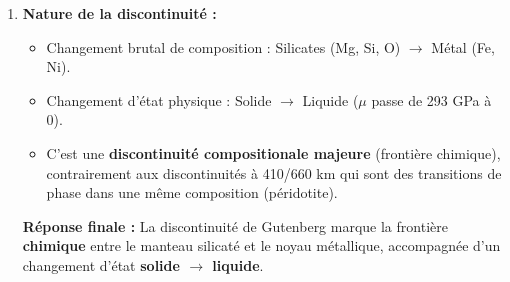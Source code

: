 \documentclass[11pt]{article}
\begin{document}
\begin{exoresolu}
\begin{enumerate}
    \item \textbf{Nature de la discontinuité :}
    \begin{itemize}
        \item Changement brutal de composition : Silicates (Mg, Si, O) $\rightarrow$ Métal (Fe, Ni).
        \item Changement d'état physique : Solide $\rightarrow$ Liquide ($\mu$ passe de 293 GPa à 0).
        \item C'est une \textbf{discontinuité compositionale majeure} (frontière chimique), contrairement aux discontinuités à 410/660 km qui sont des transitions de phase dans une même composition (péridotite).
    \end{itemize}
    \textbf{Réponse finale :} La discontinuité de Gutenberg marque la frontière \textbf{chimique} entre le manteau silicaté et le noyau métallique, accompagnée d'un changement d'état \textbf{solide $\rightarrow$ liquide}.
\end{enumerate}
\end{exoresolu}
\end{document}
